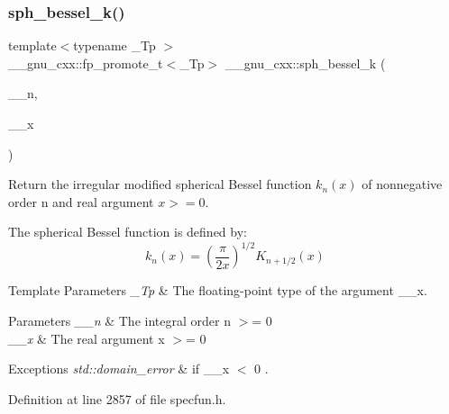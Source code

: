 \subsubsection{\texorpdfstring{sph\+\_\+bessel\+\_\+k()}{sph\_bessel\_k()}}
{\footnotesize\ttfamily template$<$typename \+\_\+\+Tp $>$ \\
\+\_\+\+\_\+gnu\+\_\+cxx\+::fp\+\_\+promote\+\_\+t$<$\+\_\+\+Tp$>$ \+\_\+\+\_\+gnu\+\_\+cxx\+::sph\+\_\+bessel\+\_\+k (\begin{DoxyParamCaption}\item[{unsigned int}]{\+\_\+\+\_\+n,  }\item[{\+\_\+\+Tp}]{\+\_\+\+\_\+x }\end{DoxyParamCaption})\hspace{0.3cm}{\ttfamily [inline]}}

Return the irregular modified spherical Bessel function $ k_n(x) $ of nonnegative order n and real argument $ x >= 0 $.

The spherical Bessel function is defined by\+: \[ k_n(x) = \left(\frac{\pi}{2x} \right) ^{1/2} K_{n+1/2}(x) \]


\begin{DoxyTemplParams}{Template Parameters}
{\em \+\_\+\+Tp} & The floating-\/point type of the argument {\ttfamily \+\_\+\+\_\+x}. \\
\hline
\end{DoxyTemplParams}

\begin{DoxyParams}{Parameters}
{\em \+\_\+\+\_\+n} & The integral order {\ttfamily  n $>$= 0 } \\
\hline
{\em \+\_\+\+\_\+x} & The real argument {\ttfamily  x $>$= 0 } \\
\hline
\end{DoxyParams}

\begin{DoxyExceptions}{Exceptions}
{\em std\+::domain\+\_\+error} & if {\ttfamily  \+\_\+\+\_\+x $<$ 0 }. \\
\hline
\end{DoxyExceptions}


Definition at line 2857 of file specfun.\+h.

\mbox{\label{group__gnu__math__spec__func_gaf886e8f8dfd2af0c4a9c5929d193d12f}} 
